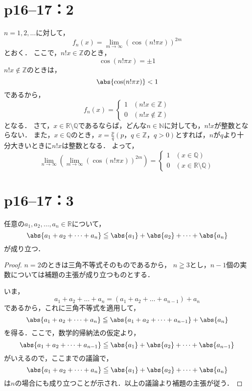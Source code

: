 \documentclass[a4paper,10pt,fleqn]{ltjsarticle}
\begin{document}
\section*{p16--17：2}

$n=1,2,\ldots$に対して，
\[
    f_{n} (x)=\lim_{m \to \infty} (\cos (n! \pi x)) ^{2m}
\]
とおく．
ここで，$n!x \in \mathbb{Z}$のとき，
\[
    \cos (n! \pi x)=\pm 1
\]
$n!x \notin \mathbb{Z}$のときは，
\[
    \abs{\cos (n! \pi x)}<1
\]
であるから，
\[
    f_{n} (x)=
    \begin{cases}
        1 & (n!x \in \mathbb{Z})    \\
        0 & (n!x \notin \mathbb{Z})
    \end{cases}
\]
となる．
さて，$x \in \mathbb{R} \setminus \mathbb{Q}$であるならば，どんな$n \in \mathbb{N}$に対しても，$n! x$が整数とならない．
また，$x \in \mathbb{Q}$のとき，$ x=\frac{p}{q}(p，q \in \mathbb{Z}，q>0)$とすれば，$n$が$q$より十分大きいときに$n!x$は整数となる．
よって，
\[
    \lim_{n \to \infty} \left( \lim_{m \to \infty} (\cos (n! \pi x)) ^{2m} \right)=
    \begin{cases}
        1 & (x \in \mathbb{Q})                      \\
        0 & (x \in \mathbb{R} \setminus \mathbb{Q})
    \end{cases}
\]


\section*{p16--17：3}


任意の$a_1 , a_2 , \dots, a_n \in \mathbb{R}$について，
\[
    \abs{a_1+a_2+\dots+a_n} \leqq \abs{a_1}+\abs{a_2}+\dots+\abs{a_n}
\]
が成り立つ．


\begin{proof}
    $n=2$のときは三角不等式そのものであるから，
    $n \geqq 3$とし，$n-1$個の実数については補題の主張が成り立つものとする．

    いま，
    \[
        a_1 + a_2 + \dots + a_n = (a_1+a_2+\dots+a_{n-1})+a_n
    \]
    であるから，これに三角不等式を適用して，
    \[
        \abs{a_1+a_2+\dots+a_n} \leqq \abs{a_1+a_2+\dots+a_{n-1}} +\abs{a_n}
    \]
    を得る．ここで，数学的帰納法の仮定より，
    \[
        \abs{a_1+a_2+\dots+a_{n-1}} \leqq \abs{a_1}+\abs{a_2}+\dots+\abs{a_{n-1}}
    \]
    がいえるので，ここまでの議論で，
    \[
        \abs{a_1+a_2+\dots+a_n} \leqq \abs{a_1}+\abs{a_2}+\dots+\abs{a_n}
    \]
    は$n$の場合にも成り立つことが示され．以上の議論より補題の主張が従う．
\end{proof}
\end{document}

